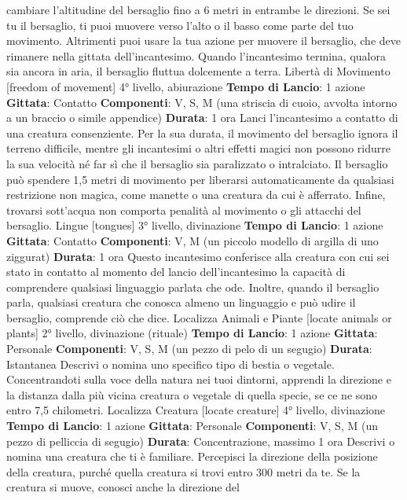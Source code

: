 \begin{multicols}{2}
cambiare l’altitudine del bersaglio fino a 6 metri in
entrambe le direzioni. Se sei tu il bersaglio, ti puoi
muovere verso l’alto o il basso come parte del tuo
movimento. Altrimenti puoi usare la tua azione per
muovere il bersaglio, che deve rimanere nella gittata
dell’incantesimo.
Quando l’incantesimo termina, qualora sia ancora in
aria, il bersaglio fluttua dolcemente a terra.
Libertà di Movimento
[freedom of movement]
4° livello, abiurazione
\textbf{Tempo di Lancio}: 1 azione
\textbf{Gittata}: Contatto
\textbf{Componenti}: V, S, M (una striscia di cuoio, avvolta
intorno a un braccio o simile appendice)
\textbf{Durata}: 1 ora
Lanci l’incantesimo a contatto di una creatura
consenziente. Per la sua durata, il movimento del
bersaglio ignora il terreno difficile, mentre gli
incantesimi o altri effetti magici non possono ridurre la
sua velocità né far sì che il bersaglio sia paralizzato o
intralciato.
Il bersaglio può spendere 1,5 metri di movimento per
liberarsi automaticamente da qualsiasi restrizione non
magica, come manette o una creatura da cui è
afferrato. Infine, trovarsi sott’acqua non comporta
penalità al movimento o gli attacchi del bersaglio.
Lingue
[tongues]
3° livello, divinazione
\textbf{Tempo di Lancio}: 1 azione
\textbf{Gittata}: Contatto
\textbf{Componenti}: V, M (un piccolo modello di argilla di uno
ziggurat)
\textbf{Durata}: 1 ora
Questo incantesimo conferisce alla creatura con cui sei
stato in contatto al momento del lancio dell’incantesimo
la capacità di comprendere qualsiasi linguaggio parlata
che ode. Inoltre, quando il bersaglio parla, qualsiasi
creatura che conosca almeno un linguaggio e può udire
il bersaglio, comprende ciò che dice.
Localizza Animali e Piante
[locate animals or plants]
2° livello, divinazione (rituale)
\textbf{Tempo di Lancio}: 1 azione
\textbf{Gittata}: Personale
\textbf{Componenti}: V, S, M (un pezzo di pelo di un segugio)
\textbf{Durata}: Istantanea
Descrivi o nomina uno specifico tipo di bestia o
vegetale. Concentrandoti sulla voce della natura nei
tuoi dintorni, apprendi la direzione e la distanza dalla
più vicina creatura o vegetale di quella specie, se ce ne
sono entro 7,5 chilometri.
Localizza Creatura
[locate creature]
4° livello, divinazione
\textbf{Tempo di Lancio}: 1 azione
\textbf{Gittata}: Personale
\textbf{Componenti}: V, S, M (un pezzo di pelliccia di segugio)
\textbf{Durata}: Concentrazione, massimo 1 ora
Descrivi o nomina una creatura che ti è familiare.
Percepisci la direzione della posizione della creatura,
purché quella creatura si trovi entro 300 metri da te. Se
la creatura si muove, conosci anche la direzione del

\end{multicols}
